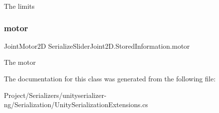 The limits 

\mbox{\label{class_serialize_slider_joint2_d_1_1_stored_information_a93a48365da01cce02a328b35df326eaa}} 
\subsubsection{\texorpdfstring{motor}{motor}}
{\footnotesize\ttfamily Joint\+Motor2D Serialize\+Slider\+Joint2\+D.\+Stored\+Information.\+motor}



The motor 



The documentation for this class was generated from the following file\+:\begin{DoxyCompactItemize}
\item 
Project/\+Serializers/unityserializer-\/ng/\+Serialization/Unity\+Serialization\+Extensions.\+cs\end{DoxyCompactItemize}
